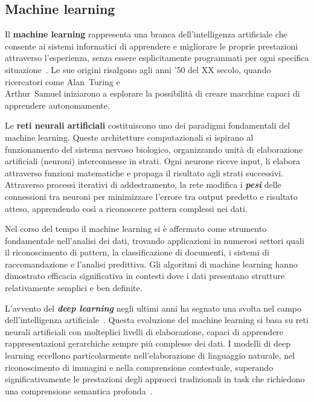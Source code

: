 \documentclass[12pt,twoside]{report}
\begin{document}
\subsection{Machine learning}
\label{subsec:machine_learning}

Il \textbf{machine learning} rappresenta una branca dell'intelligenza artificiale che consente ai sistemi informatici di apprendere e migliorare le proprie prestazioni attraverso l'esperienza, senza essere esplicitamente programmati per ogni specifica situazione~\cite{shinde2018review_ml_dl}. Le sue origini risalgono agli anni '50 del XX secolo, quando ricercatori come Alan~Turing e\\
Arthur~Samuel iniziarono a esplorare la possibilità di creare macchine capaci di apprendere autonomamente.

Le \textbf{reti neurali artificiali} costituiscono uno dei paradigmi fondamentali del machine learning. Queste architetture computazionali si ispirano al funzionamento del sistema nervoso biologico, organizzando unità di elaborazione artificiali (neuroni) interconnesse in strati. Ogni neurone riceve input, li elabora attraverso funzioni matematiche e propaga il risultato agli strati successivi. Attraverso processi iterativi di addestramento, la rete modifica i \textbf{\textit{pesi}} delle connessioni tra neuroni per minimizzare l'errore tra output predetto e risultato atteso, apprendendo così a riconoscere pattern complessi nei dati.

Nel corso del tempo il machine learning si è affermato come strumento fondamentale nell'analisi dei dati, trovando applicazioni in numerosi settori quali il riconoscimento di pattern, la classificazione di documenti, i sistemi di raccomandazione e l'analisi predittiva. Gli algoritmi di machine learning hanno dimostrato efficacia significativa in contesti dove i dati presentano strutture relativamente semplici e ben definite.

L'avvento del \textbf{\textit{deep learning}} negli ultimi anni ha segnato una svolta nel campo dell'intelligenza artificiale~\cite{shinde2018review_ml_dl}. Questa evoluzione del machine learning si basa su reti neurali artificiali con molteplici livelli di elaborazione, capaci di apprendere rappresentazioni gerarchiche sempre più complesse dei dati. I modelli di deep learning eccellono particolarmente nell'elaborazione di linguaggio naturale, nel riconoscimento di immagini e nella comprensione contestuale, superando significativamente le prestazioni degli approcci tradizionali in task che richiedono una comprensione semantica profonda~\cite{elkhatiba2024performance_benchmarking}.
\end{document}
